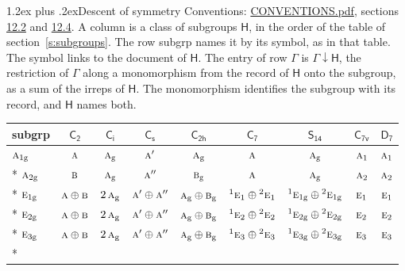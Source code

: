 \documentclass[10pt,a4paper]{article}
\makeatletter
\renewcommand\section{\@startsection{section}{1}{\z@}{-3ex plus -1ex minus -.2ex}%
  {1.2ex plus .2ex}{\normalfont\large\sffamily\bfseries\color{parttitle}}}
\numberwithin{equation}{section}
\newcommand{\grp}[1]{\mathsf{#1}}
\newcommand{\irr}[1]{\text{\normalfont\scshape #1}}
\newcommand{\conjpair}[1]{{}^{#1}}
\newcommand{\ptag}[1]{\mathrm{#1}}
\newcommand{\restr}[2]{#1\!\downarrow#2}
\makeatother
\begin{document}
\section{Descent of symmetry}\label{s:subduction}
Conventions: \href{../../CONVENTIONS.pdf}{CONVENTIONS.pdf}, sections \href{../../CONVENTIONS.pdf\#conv.12.2}{12.2} and \href{../../CONVENTIONS.pdf\#conv.12.4}{12.4}.
A column is a class of subgroups $\grp{H}$, in the order of the table of section~\ref{s:subgroups}. The row subgrp names it by its symbol, as in that table. The symbol links to the document of $\grp{H}$. The entry of row $\Gamma$ is $\restr{\Gamma}{\grp{H}}$, the restriction of $\Gamma$ along a monomorphism from the record of $\grp{H}$ onto the subgroup, as a sum of the irreps of $\grp{H}$. The monomorphism identifies the subgroup with its record, and $\grp{H}$ names both.
{\small\begin{longtable}{@{}lcccccccc@{}}\toprule
subgrp & \href{C2.pdf}{$\grp{C_{2}}$} & \href{S2.pdf}{$\grp{C_{i}}$} & \href{C1v.pdf}{$\grp{C_{s}}$} & \href{C2h.pdf}{$\grp{C_{2h}}$} & \href{C7.pdf}{$\grp{C_{7}}$} & \href{S14.pdf}{$\grp{S_{14}}$} & \href{C7v.pdf}{$\grp{C_{7v}}$} & \href{D7.pdf}{$\grp{D_{7}}$}\\\midrule\endhead
\bottomrule\endfoot\endlastfoot
$\irr{a}_{1\ptag{g}}$ & $\irr{a}$ & $\irr{a}_{\ptag{g}}$ & $\irr{a}'$ & $\irr{a}_{\ptag{g}}$ & $\irr{a}$ & $\irr{a}_{\ptag{g}}$ & $\irr{a}_{1}$ & $\irr{a}_{1}$\\*
$\irr{a}_{2\ptag{g}}$ & $\irr{b}$ & $\irr{a}_{\ptag{g}}$ & $\irr{a}''$ & $\irr{b}_{\ptag{g}}$ & $\irr{a}$ & $\irr{a}_{\ptag{g}}$ & $\irr{a}_{2}$ & $\irr{a}_{2}$\\*
$\irr{e}_{1\ptag{g}}$ & $\irr{a}\oplus \irr{b}$ & $2\,\irr{a}_{\ptag{g}}$ & $\irr{a}'\oplus \irr{a}''$ & $\irr{a}_{\ptag{g}}\oplus \irr{b}_{\ptag{g}}$ & $\conjpair{1}\irr{e}_{1}\oplus \conjpair{2}\irr{e}_{1}$ & $\conjpair{1}\irr{e}_{1\ptag{g}}\oplus \conjpair{2}\irr{e}_{1\ptag{g}}$ & $\irr{e}_{1}$ & $\irr{e}_{1}$\\*
$\irr{e}_{2\ptag{g}}$ & $\irr{a}\oplus \irr{b}$ & $2\,\irr{a}_{\ptag{g}}$ & $\irr{a}'\oplus \irr{a}''$ & $\irr{a}_{\ptag{g}}\oplus \irr{b}_{\ptag{g}}$ & $\conjpair{1}\irr{e}_{2}\oplus \conjpair{2}\irr{e}_{2}$ & $\conjpair{1}\irr{e}_{2\ptag{g}}\oplus \conjpair{2}\irr{e}_{2\ptag{g}}$ & $\irr{e}_{2}$ & $\irr{e}_{2}$\\*
$\irr{e}_{3\ptag{g}}$ & $\irr{a}\oplus \irr{b}$ & $2\,\irr{a}_{\ptag{g}}$ & $\irr{a}'\oplus \irr{a}''$ & $\irr{a}_{\ptag{g}}\oplus \irr{b}_{\ptag{g}}$ & $\conjpair{1}\irr{e}_{3}\oplus \conjpair{2}\irr{e}_{3}$ & $\conjpair{1}\irr{e}_{3\ptag{g}}\oplus \conjpair{2}\irr{e}_{3\ptag{g}}$ & $\irr{e}_{3}$ & $\irr{e}_{3}$\\*

\end{longtable}}
\end{document}
